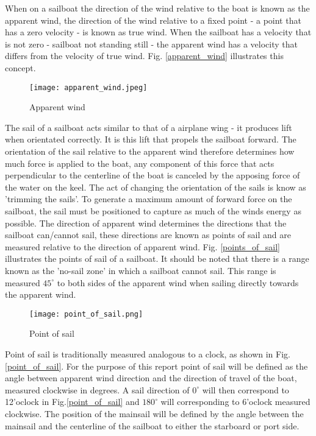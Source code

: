 When on a sailboat the direction of the wind relative to the boat is known as the apparent wind, the direction of the wind relative to a fixed point - 
a point that has a zero velocity - is known as true wind. When the sailboat has a velocity that is not zero - sailboat not standing still - the apparent 
wind has a velocity that differs from the velocity of true wind. Fig. \ref{apparent_wind} illustrates this concept. 

\begin{figure}
    \centering
    \texttt{[image: apparent\_wind.jpeg]}
    \caption[Apparent wind]{Apparent wind\cite{apparent_wind} }
    \label{fig:apparent_wind}
\end{figure}


The sail of a sailboat acts similar to that of a airplane wing - it produces lift when orientated correctly. It is this lift that propels the sailboat 
forward. The orientation of the sail relative to the apparent wind therefore determines how much force is applied to the boat, any component of this force
that acts perpendicular to the centerline of the boat is canceled by the apposing force of the water on the keel. The act of changing the orientation of 
the sails is know as 'trimming the sails'. To generate a maximum amount of forward force on the sailboat, the sail must be positioned to capture as much 
of the winds energy as possible. The direction of apparent wind determines the directions that the sailboat can/cannot sail, these directions are known as 
points of sail and are measured relative to the direction of apparent wind. Fig. \ref{points_of_sail} illustrates the points of sail of a sailboat. It should 
be noted that there is a range known as the 'no-sail zone' in which a sailboat cannot sail. This range is measured $45^{\circ}$ to both sides of the apparent wind
when sailing directly towards the apparent wind.

\begin{figure}[!h]
    \centering
    \texttt{[image: point\_of\_sail.png]}
    \caption[Point of sail]{Point of sail\cite{ASA} }
    \label{fig:point_of_sail}
\end{figure}

Point of sail is traditionally measured analogous to a clock, as shown in Fig. \ref{point_of_sail}. For the purpose of this report point of sail will be defined 
as the angle between apparent wind direction and the direction of travel of the boat, measured clockwise in degrees. A sail direction of $0^{\circ}$ will 
then correspond to 12'oclock in Fig.\ref{point_of_sail} and $180^{\circ}$ will corresponding to 6'oclock measured clockwise. The position of the mainsail will be 
defined by the angle between the mainsail and the centerline of the sailboat to either the starboard or port side.


